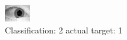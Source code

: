 \begin{figure}[h!]
\begin{center}
\includegraphics[width=0.60\columnwidth]{figures/ID1587_class_2_target_1.png}
\end{center}
\caption{ Classification: 2 actual target: 1}
\label{fig:ID1587_class_2_target_1}
\end{figure}
